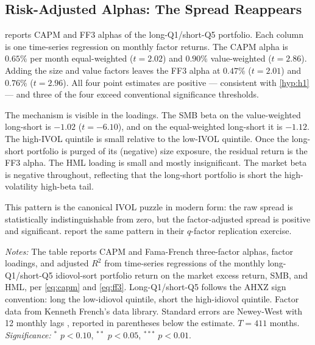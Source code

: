 \documentclass[12pt]{article}
\newcommand{\1}[1]{\mathds{1}\left[#1\right]}
\begin{document}
\subsection{Risk-Adjusted Alphas: The Spread Reappears}

 reports CAPM and FF3 alphas of the long-Q1/short-Q5
portfolio. Each column is one time-series regression on monthly factor
returns. The CAPM alpha is $0.65\%$ per month equal-weighted ($t=2.02$) and
$0.90\%$ value-weighted ($t=2.86$). Adding the size and value factors leaves
the FF3 alpha at $0.47\%$ ($t=2.01$) and $0.76\%$ ($t=2.96$). All four point
estimates are positive --- consistent with \cref{hyp:h1} --- and three of the
four exceed conventional significance thresholds.

The mechanism is visible in the loadings. The SMB beta on the value-weighted
long-short is $-1.02$ ($t=-6.10$), and on the equal-weighted long-short it
is $-1.12$. The high-IVOL quintile is small relative to the low-IVOL
quintile. Once the long-short portfolio is purged of its (negative) size
exposure, the residual return is the FF3 alpha. The HML loading is small and
mostly insignificant. The market beta is negative throughout, reflecting that
the long-short portfolio is short the high-volatility high-beta tail.

This pattern is the canonical IVOL puzzle in modern form: the raw spread is
statistically indistinguishable from zero, but the factor-adjusted spread is
positive and significant.
\citet{hou2020replicating} report the same pattern in their $q$-factor
replication exercise.

\begin{table}[H]
\centering
\begin{threeparttable}
\caption{CAPM and FF3 alphas of the long-Q1/short-Q5 portfolio,
1990--2024}\label{tab:alphas}
\small

\begin{tablenotes}\small
\item \textit{Notes:} The table reports CAPM and Fama-French three-factor
alphas, factor loadings, and adjusted $R^2$ from time-series regressions of
the monthly long-Q1/short-Q5 idiovol-sort portfolio return on the market
excess return, SMB, and HML, per \eqref{eq:capm} and \eqref{eq:ff3}.
Long-Q1/short-Q5 follows the AHXZ sign convention: long the low-idiovol
quintile, short the high-idiovol quintile. Factor data from Kenneth French's
data library. Standard errors are Newey-West with 12 monthly lags
\citep{newey1987simple}, reported in parentheses below the estimate. $T=411$
months. \emph{Significance:} $^{*}$ $p<0.10$, $^{**}$ $p<0.05$,
$^{***}$ $p<0.01$.
\end{tablenotes}
\end{threeparttable}
\end{table}
\end{document}
